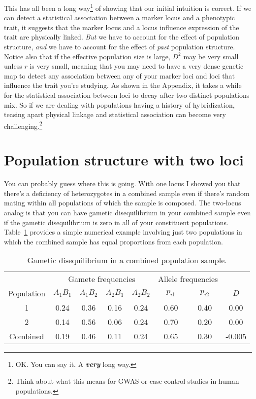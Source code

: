 This has all been a long way\footnote{OK. You can say it. A {\bf\it
    very\/} long way.} of showing that our initial intuition is
correct. If we can detect a statistical association between a marker
locus and a phenotypic trait, it suggests that the marker locus and a
locus influence expression of the trait are physically linked. {\it
  But\/} we have to account for the effect of population structure,
{\it and\/} we have to account for the effect of {\it past\/}
population structure. Notice also that if the effective population
size is large, $D^2$ may be very small unless $r$ is very small,
meaning that you may need to have a very dense genetic map to detect
any association between any of your marker loci and loci that
influence the trait you're studying. As shown in the Appendix, it
takes a while for the statistical association between loci to decay
after two distinct populations mix. So if we are dealing with
populations having a history of hybridization, teasing apart physical
linkage and statistical association can become very
challenging.\footnote{Think about what this means for GWAS or
  case-control studies in human populations.}

\section*{Population structure with two loci}

You can probably guess where this is going. With one locus I showed
you that there's a deficiency of heterozygotes in a combined sample
even if there's random mating within all populations of which the
sample is composed. The two-locus analog is that you can have gametic
disequilibrium in your combined sample even if the gametic
disequilibrium is zero in all of your constituent
populations. Table~\ref{table:d-structure} provides a simple numerical
example involving just two populations in which the combined sample
has equal proportions from each population.

\begin{table}
\begin{center}
\begin{tabular}{c|cccc|cc|c}
\hline\hline
           & \multicolumn{4}{c|}{Gamete frequencies}
           & \multicolumn{2}{c|}{Allele frequencies} \\
Population & $A_1B_1$ & $A_1B_2$ & $A_2B_1$ & $A_2B_2$
           & $p_{i1}$ & $p_{i2}$ & $D$ \\
\hline
1          & 0.24     & 0.36     & 0.16    & 0.24
           & 0.60     & 0.40     & 0.00 \\
2          & 0.14     & 0.56     & 0.06    & 0.24
           & 0.70     & 0.20     & 0.00 \\
Combined   & 0.19     & 0.46     & 0.11    & 0.24
           & 0.65     & 0.30     & -0.005 \\
\hline
\end{tabular}
\end{center}
\caption{Gametic disequilibrium in a combined population
  sample.}\label{table:d-structure}
\end{table}

